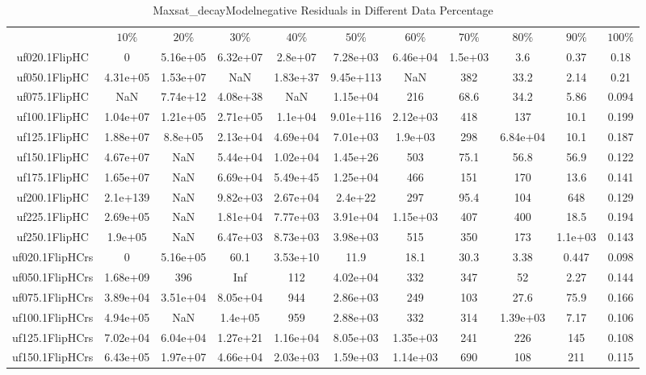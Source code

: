 \begin{table}[htbp]
\caption{Maxsat_decayModelnegative Residuals in Different Data Percentage}
\centering
\begin{tabular}{|ccccccccccc|}
\hline
 & $10\%$ & $20\%$ & $30\%$ & $40\%$ & $50\%$ & $60\%$ & $70\%$ & $80\%$ & $90\%$ & $100\%$ \\
uf020.1FlipHC &    0 & 5.16e+05 & 6.32e+07 & 2.8e+07 & 7.28e+03 & 6.46e+04 & 1.5e+03 &  3.6 & 0.37 & 0.18 \\
uf050.1FlipHC & 4.31e+05 & 1.53e+07 & NaN & 1.83e+37 & 9.45e+113 & NaN &  382 & 33.2 & 2.14 & 0.21 \\
uf075.1FlipHC & NaN & 7.74e+12 & 4.08e+38 & NaN & 1.15e+04 &  216 & 68.6 & 34.2 & 5.86 & 0.094 \\
uf100.1FlipHC & 1.04e+07 & 1.21e+05 & 2.71e+05 & 1.1e+04 & 9.01e+116 & 2.12e+03 &  418 &  137 & 10.1 & 0.199 \\
uf125.1FlipHC & 1.88e+07 & 8.8e+05 & 2.13e+04 & 4.69e+04 & 7.01e+03 & 1.9e+03 &  298 & 6.84e+04 & 10.1 & 0.187 \\
uf150.1FlipHC & 4.67e+07 & NaN & 5.44e+04 & 1.02e+04 & 1.45e+26 &  503 & 75.1 & 56.8 & 56.9 & 0.122 \\
uf175.1FlipHC & 1.65e+07 & NaN & 6.69e+04 & 5.49e+45 & 1.25e+04 &  466 &  151 &  170 & 13.6 & 0.141 \\
uf200.1FlipHC & 2.1e+139 & NaN & 9.82e+03 & 2.67e+04 & 2.4e+22 &  297 & 95.4 &  104 &  648 & 0.129 \\
uf225.1FlipHC & 2.69e+05 & NaN & 1.81e+04 & 7.77e+03 & 3.91e+04 & 1.15e+03 &  407 &  400 & 18.5 & 0.194 \\
uf250.1FlipHC & 1.9e+05 & NaN & 6.47e+03 & 8.73e+03 & 3.98e+03 &  515 &  350 &  173 & 1.1e+03 & 0.143 \\
uf020.1FlipHCrs &    0 & 5.16e+05 & 60.1 & 3.53e+10 & 11.9 & 18.1 & 30.3 & 3.38 & 0.447 & 0.098 \\
uf050.1FlipHCrs & 1.68e+09 &  396 &  Inf &  112 & 4.02e+04 &  332 &  347 &   52 & 2.27 & 0.144 \\
uf075.1FlipHCrs & 3.89e+04 & 3.51e+04 & 8.05e+04 &  944 & 2.86e+03 &  249 &  103 & 27.6 & 75.9 & 0.166 \\
uf100.1FlipHCrs & 4.94e+05 & NaN & 1.4e+05 &  959 & 2.88e+03 &  332 &  314 & 1.39e+03 & 7.17 & 0.106 \\
uf125.1FlipHCrs & 7.02e+04 & 6.04e+04 & 1.27e+21 & 1.16e+04 & 8.05e+03 & 1.35e+03 &  241 &  226 &  145 & 0.108 \\
uf150.1FlipHCrs & 6.43e+05 & 1.97e+07 & 4.66e+04 & 2.03e+03 & 1.59e+03 & 1.14e+03 &  690 &  108 &  211 & 0.115 \\

\end{tabular}
\end{table}
